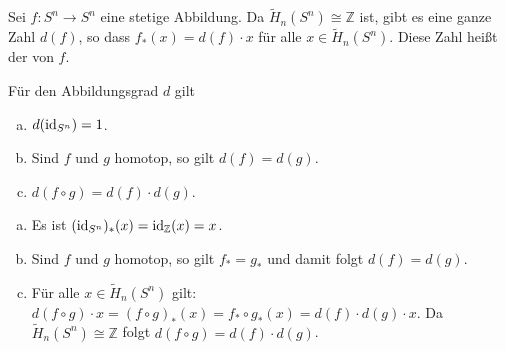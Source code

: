 \begin{definition}[{name={Abbildungsgrad}}]
	Sei $f \colon S^n \to S^n$ eine stetige Abbildung. 
	Da $\tilde{H}_n(S^n) \cong \mathbb{Z}$ ist, gibt es eine ganze Zahl $d(f)$, so dass $f_*(x)= d(f) \cdot x$ für alle $x \in \tilde{H}_n(S^n)$. 
	Diese Zahl heißt der  von $f$.
\end{definition}

\begin{proposition}[{name=[Einfache Eigenschaften des Abbildungsgrades]}]
	Für den Abbildungsgrad $d$ gilt
	\begin{enumerate}[a)]
		\item $d(\operatorname{id}_{S^n}) = 1$.
		\item Sind $f$ und $g$ homotop, so gilt $d(f)=d(g)$.
		\item $d(f \circ g) = d(f) \cdot d(g)$.
	\end{enumerate}
\end{proposition}
\begin{beweis}
	\leavevmode
	\begin{enumerate}[a),itemsep=0pt]
		\item Es ist $(\operatorname{id}_{S^n})_*(x)= \operatorname{id}_\mathbb{Z}(x)= x$.
		\item Sind $f$ und $g$ homotop, so gilt $f_*=g_*$ und damit folgt $d(f)=d(g)$.
		\item Für alle $x \in \tilde{H}_n(S^n)$ gilt: $d(f \circ g) \cdot x = (f \circ g)_* (x) = f_* \circ g_*(x)= d(f) \cdot d(g) \cdot x$. Da 
		$\tilde{H}_n(S^n) \cong \mathbb{Z}$ folgt $d(f \circ g) = d(f) \cdot d(g)$. \qedhere
	\end{enumerate}
\end{beweis}

